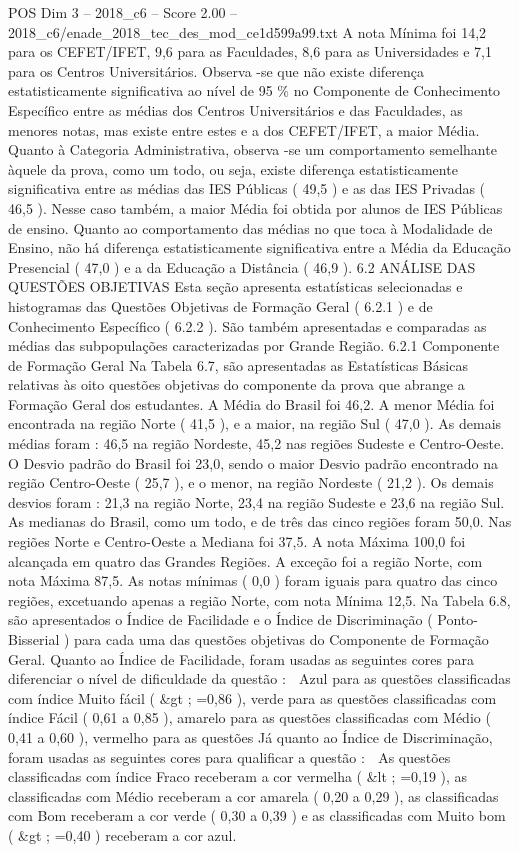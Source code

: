 \begin{textsample}{POS Dim 3 – 2018\_c6 – Score 2.00 – 2018\_c6/enade\_2018\_tec\_des\_mod\_ce1d599a99.txt}
A nota Mínima foi 14,2 para os CEFET/IFET, 9,6 para as Faculdades, 8,6 para as Universidades e 7,1 para os Centros Universitários.
Observa -se que não existe diferença estatisticamente significativa ao nível de 95 \% no Componente de Conhecimento Específico entre as médias dos Centros Universitários e das Faculdades, as menores notas, mas existe entre estes e a dos CEFET/IFET, a maior Média.
Quanto à Categoria Administrativa, observa -se um comportamento semelhante àquele da prova, como um todo, ou seja, existe diferença estatisticamente significativa entre as médias das IES Públicas ( 49,5 ) e as das IES Privadas ( 46,5 ).
Nesse caso também, a maior Média foi obtida por alunos de IES Públicas de ensino.
Quanto ao comportamento das médias no que toca à Modalidade de Ensino, não há diferença estatisticamente significativa entre a Média da Educação Presencial ( 47,0 ) e a da Educação a Distância ( 46,9 ). 6.2 ANÁLISE DAS QUESTÕES OBJETIVAS Esta seção apresenta estatísticas selecionadas e histogramas das Questões Objetivas de Formação Geral ( 6.2.1 ) e de Conhecimento Específico ( 6.2.2 ).
São também apresentadas e comparadas as médias das subpopulações caracterizadas por Grande Região. 6.2.1 Componente de Formação Geral Na Tabela 6.7, são apresentadas as Estatísticas Básicas relativas às oito questões objetivas do componente da prova que abrange a Formação Geral dos estudantes.
A Média do Brasil foi 46,2.
A menor Média foi encontrada na região Norte ( 41,5 ), e a maior, na região Sul ( 47,0 ).
As demais médias foram : 46,5 na região Nordeste, 45,2 nas regiões Sudeste e Centro-Oeste.
O Desvio padrão do Brasil foi 23,0, sendo o maior Desvio padrão encontrado na região Centro-Oeste ( 25,7 ), e o menor, na região Nordeste ( 21,2 ).
Os demais desvios foram : 21,3 na região Norte, 23,4 na região Sudeste e 23,6 na região Sul.
As medianas do Brasil, como um todo, e de três das cinco regiões foram 50,0.
Nas regiões Norte e Centro-Oeste a Mediana foi 37,5.
A nota Máxima 100,0 foi alcançada em quatro das Grandes Regiões.
A exceção foi a região Norte, com nota Máxima 87,5.
As notas mínimas ( 0,0 ) foram iguais para quatro das cinco regiões, excetuando apenas a região Norte, com nota Mínima 12,5.
Na Tabela 6.8, são apresentados o Índice de Facilidade e o Índice de Discriminação ( Ponto-Bisserial ) para cada uma das questões objetivas do Componente de Formação Geral.
Quanto ao Índice de Facilidade, foram usadas as seguintes cores para diferenciar o nível de dificuldade da questão :  Azul para as questões classificadas com índice Muito fácil ( \&gt ; =0,86 ), verde para as questões classificadas com índice Fácil ( 0,61 a 0,85 ), amarelo para as questões classificadas com Médio ( 0,41 a 0,60 ), vermelho para as questões Já quanto ao Índice de Discriminação, foram usadas as seguintes cores para qualificar a questão :  As questões classificadas com índice Fraco receberam a cor vermelha ( \&lt ; =0,19 ), as classificadas com Médio receberam a cor amarela ( 0,20 a 0,29 ), as classificadas com Bom receberam a cor verde ( 0,30 a 0,39 ) e as classificadas com Muito bom ( \&gt ; =0,40 ) receberam a cor azul.

\end{textsample}
